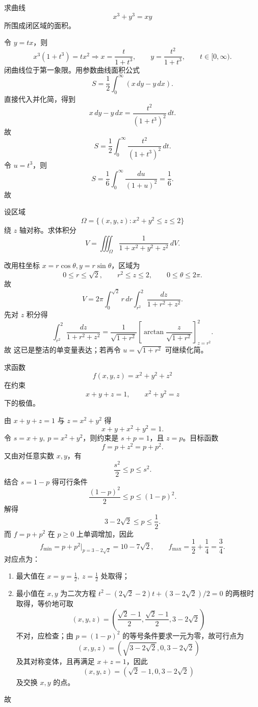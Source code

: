 \begin{question}
求曲线
\[
 x^3+y^3=xy
\]
所围成闭区域的面积。
\begin{solution}

令 $y=tx$，则
\[
 x^3(1+t^3)=tx^2 \Longrightarrow x=\frac{t}{1+t^3},\qquad y=\frac{t^2}{1+t^3},\qquad t\in[0,\infty).
\]
闭曲线位于第一象限。用参数曲线面积公式
\[
S=\frac12\int_0^{\infty}(x\,dy-y\,dx).
\]
直接代入并化简，得到
\[
 x\,dy-y\,dx=\frac{t^2}{(1+t^3)^2}\,dt.
\]
故
\[
 S=\frac12\int_0^{\infty}\frac{t^2}{(1+t^3)^2}\,dt.
\]
令 $u=t^3$，则
\[
S=\frac16\int_0^{\infty}\frac{du}{(1+u)^2}=\frac16.
\]
故
\end{solution}
\end{question}

\begin{question}
设区域
\[
\Omega=\{(x,y,z):x^2+y^2\le z\le 2\}
\]
绕 $z$ 轴对称。求体积分
\[
V=\iiint_{\Omega}\frac{1}{1+x^2+y^2+z^2}\,dV.
\]

\begin{solution}

改用柱坐标 $x=r\cos\theta,y=r\sin\theta$，区域为
\[
0\le r\le\sqrt2,
\qquad r^2\le z\le2,
\qquad 0\le\theta\le2\pi.
\]
故
\[
V=2\pi\int_0^{\sqrt2}r\,dr\int_{r^2}^{2}\frac{dz}{1+r^2+z^2}.
\]
先对 $z$ 积分得
\[
\int_{r^2}^{2}\frac{dz}{1+r^2+z^2}=\frac{1}{\sqrt{1+r^2}}\left[\arctan\frac{z}{\sqrt{1+r^2}}\right]_{z=r^2}^{2}.
\]
故
这已是整洁的单变量表达；若再令 $u=\sqrt{1+r^2}$ 可继续化简。
\end{solution}
\end{question}

\begin{question}
求函数
\[
 f(x,y,z)=x^2+y^2+z^2
\]
在约束
\[
 x+y+z=1,
\qquad x^2+y^2= z
\]
下的极值。
\begin{solution}

由 $x+y+z=1$ 与 $z=x^2+y^2$ 得
\[
 x+y+x^2+y^2=1.
\]
令 $s=x+y,\ p=x^2+y^2$，则约束是 $s+p=1$，且 $z=p$。目标函数
\[
 f=p+z^2=p+p^2.
\]
又由对任意实数 $x,y$，有
\[
\frac{s^2}{2}\le p\le s^2.
\]
结合 $s=1-p$ 得可行条件
\[
\frac{(1-p)^2}{2}\le p\le (1-p)^2.
\]
解得
\[
 3-2\sqrt2\le p\le \frac12.
\]
而 $f=p+p^2$ 在 $p\ge0$ 上单调增加，因此
\[
 f_{\min}=p+p^2\Big|_{p=3-2\sqrt2}=10-7\sqrt2,
\qquad
 f_{\max}=\frac12+\frac14=\frac34.
\]
对应点为：
\begin{enumerate}[label=（\arabic*）,leftmargin=2.8em,itemsep=0.2em]
\item 最大值在 $x=y=\tfrac12,\ z=\tfrac12$ 处取得；
\item 最小值在 $x,y$ 为二次方程 $t^2-(2\sqrt2-2)t+(3-2\sqrt2)/2=0$ 的两根时取得，等价地可取
\[
(x,y,z)=\left(\frac{\sqrt2-1}{2},\frac{\sqrt2-1}{2},3-2\sqrt2\right)
\]
不对，应检查；由 $p=(1-p)^2$ 的等号条件要求一元为零，故可行点为
\[
(x,y,z)=(\sqrt{3-2\sqrt2},0,3-2\sqrt2)
\]
及其对称变体，且再满足 $x+z=1$，因此
\[
(x,y,z)=(\sqrt2-1,0,3-2\sqrt2)
\]
及交换 $x,y$ 的点。
\end{enumerate}
故
\end{solution}
\end{question}



